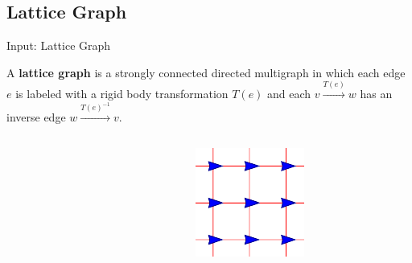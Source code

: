 \documentclass[10pt]{beamer}
\newcommand{\edge}[3]{{#1}\overset{#2}{\longrightarrow}{#3}}
\begin{document}
\subsection{Lattice Graph}
\begin{frame}{Input: Lattice Graph}
  \begin{definition}
    A \textbf{lattice graph} is a strongly connected directed
      multigraph in which each edge $e$ is labeled with a rigid body
      transformation $T(e)$ and each $\edge{v}{T(e)}{w}$ has an
      inverse edge $\edge{w}{T(e)^{-1}}{v}$.  
    \end{definition}
    \begin{columns}[T] %
      \begin{column}{.45\textwidth}
        \begin{figure}
          \centering
        \end{figure}
      \end{column}%
      \begin{column}{.45\textwidth}
        \begin{figure}
          \centering
          \includegraphics[scale=1]{figs/squarelattice}
        \end{figure}
      \end{column}%
    \end{columns}
\end{frame}
\end{document}
